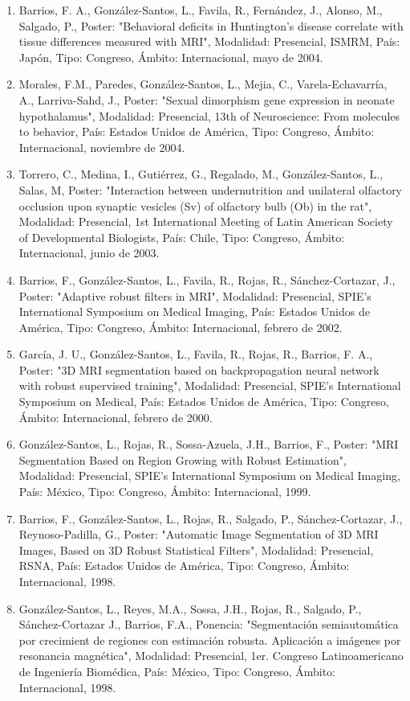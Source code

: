\documentclass[12pt]{article}
\begin{document}
\begin{enumerate}
\item Barrios, F. A., González-Santos, L., Favila, R., Fernández, J., Alonso, M., Salgado, P., Poster: "Behavioral deficits in 
Huntington’s disease correlate with tissue differences measured with MRI", Modalidad: Presencial, ISMRM, País: Japón, Tipo: Congreso, 
Ámbito: Internacional, mayo de 2004.

\item Morales, F.M., Paredes, González-Santos, L., Mejia, C., Varela-Echavarría, A., Larriva-Sahd, J., Poster: "Sexual dimorphism gene 
expression in neonate hypothalamus", Modalidad: Presencial, 13th of Neuroscience: From molecules to behavior, País: Estados Unidos de 
América, Tipo: Congreso, Ámbito: Internacional, noviembre de 2004.

\item Torrero, C., Medina, I., Gutiérrez, G., Regalado, M., González-Santos, L., Salas, M, Poster: "Interaction between undernutrition 
and unilateral olfactory occlusion upon synaptic vesicles (Sv) of olfactory bulb (Ob) in the rat", Modalidad: Presencial, 1st 
International Meeting of Latin American Society of Developmental Biologists, País: Chile, Tipo: Congreso, Ámbito: Internacional, junio 
de 2003.

\item Barrios, F., González-Santos, L., Favila, R., Rojas, R., Sánchez-Cortazar, J., Poster: "Adaptive robust filters in MRI", 
Modalidad: 
Presencial, SPIE's International Symposium on Medical Imaging, País: Estados Unidos de América, Tipo: Congreso, Ámbito: Internacional, 
febrero de 2002.

\item García, J. U., González-Santos, L., Favila, R., Rojas, R., Barrios, F. A., Poster: "3D MRI segmentation based on backpropagation 
neural network with robust supervised training", Modalidad: Presencial, SPIE's International Symposium on Medical, País: Estados Unidos 
de América, Tipo: Congreso, Ámbito: Internacional, febrero de 2000.

\item González-Santos, L., Rojas, R., Sossa-Azuela, J.H., Barrios, F., Poster: "MRI Segmentation Based on Region Growing with Robust 
Estimation", Modalidad: Presencial, SPIE's International Symposium on Medical Imaging, País: México, Tipo: Congreso, Ámbito: 
Internacional, 1999.

\item Barrios, F., González-Santos, L., Rojas, R., Salgado, P., Sánchez-Cortazar, J., Reynoso-Padilla, G., Poster: "Automatic Image 
Segmentation of 3D MRI Images, Based on 3D Robust Statistical Filters", Modalidad: Presencial, RSNA, País: Estados Unidos de América, 
Tipo: Congreso, Ámbito: Internacional, 1998.

\item González-Santos, L., Reyes, M.A., Sossa, J.H., Rojas, R., Salgado, P., Sánchez-Cortazar J., Barrios, F.A., Ponencia: 
"Segmentación 
semiautomática por crecimient de regiones con estimación robusta. Aplicación a imágenes por resonancia magnética", Modalidad: 
Presencial, 1er. Congreso Latinoamericano de Ingeniería Biomédica, País: México, Tipo: Congreso, Ámbito: Internacional, 1998.
\end{enumerate}
\end{document}
